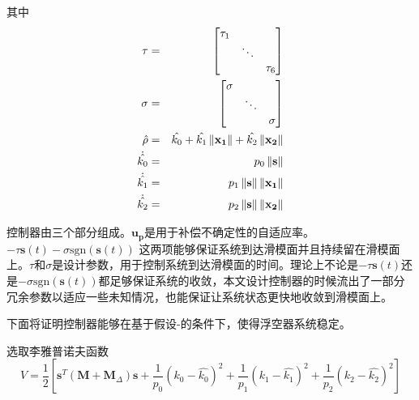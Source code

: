其中
\begin{eqnarray}
    \tau &=& \left[\begin{matrix}
         \tau_1&&  \\
         &\ddots& \\
         &&\tau_6
    \end{matrix}\right] \\
    \sigma &=& \left[\begin{matrix}
         \sigma&&  \\
         &\ddots& \\
         &&\sigma
    \end{matrix}\right] \\
    \hat{\rho}&=&\hat{k_0}+\hat{k_1}\left\lVert\mathbf{x_1}\right\rVert+\hat{k_2}\left\lVert\mathbf{x_2}\right\rVert \label{eq:inputrho} \\
    \dot{\hat{k_0}}&=&p_0\left\lVert\mathbf{s}\right\rVert \label{eq:adlaw1} \\
    \dot{\hat{k_1}}&=&p_1\left\lVert\mathbf{s}\right\rVert\left\lVert\mathbf{x_1}\right\rVert \label{eq:adlaw2} \\
    \dot{\hat{k_2}}&=&p_2\left\lVert\mathbf{s}\right\rVert\left\lVert\mathbf{x_2}\right\rVert \label{eq:adlaw3}
\end{eqnarray}

\begin{rem}
控制器由三个部分组成。$\mathbf{u_p}$是用于补偿不确定性的自适应率。$-\tau\mathbf{s}(t)-\sigma \mathrm{sgn}(\mathbf{s}(t))$ 这两项能够保证系统到达滑模面并且持续留在滑模面上。$\tau$和$\sigma$是设计参数，用于控制系统到达滑模面的时间。理论上不论是$-\tau\mathbf{s}(t)$还是$-\sigma \mathrm{sgn}(\mathbf{s}(t))$都足够保证系统的收敛，本文设计控制器的时候流出了一部分冗余参数以适应一些未知情况，也能保证让系统状态更快地收敛到滑模面上。
\end{rem}

下面将证明控制器能够在基于假设-的条件下，使得浮空器系统稳定。

选取李雅普诺夫函数
\begin{equation}\label{eq:3lyapnov}
    V=\frac{1}{2}\left[\mathbf{s}^T(\mathbf{M}+\mathbf{M}_{\Delta})\mathbf{s}+\frac{1}{p_0}(k_0-\hat{k_0})^2+\frac{1}{p_1}(k_1-\hat{k_1})^2+\frac{1}{p_2}(k_2-\hat{k_2})^2\right]
\end{equation}

